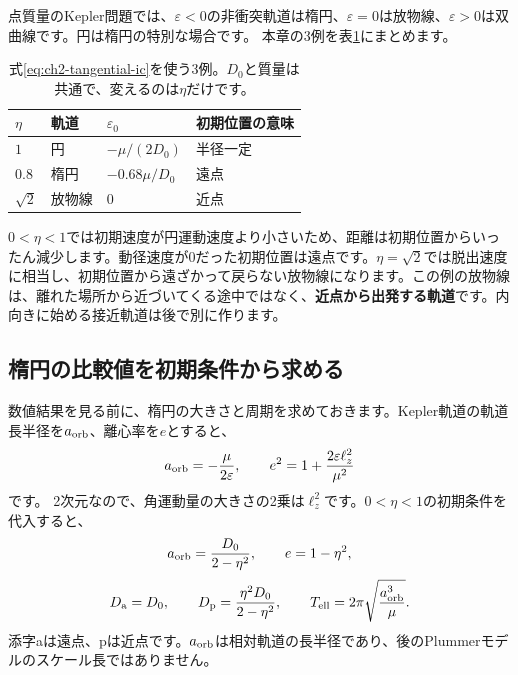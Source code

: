 点質量のKepler問題では、$\varepsilon<0$の非衝突軌道は楕円、$\varepsilon=0$は放物線、$\varepsilon>0$は双曲線です。円は楕円の特別な場合です。\cite{ryden2025} 本章の3例を表\ref{tab:ch2-types}にまとめます。
\begin{table}[htbp]
\centering\small
\caption{式\eqref{eq:ch2-tangential-ic}を使う3例。$D_0$と質量は共通で、変えるのは$\eta$だけです。}
\label{tab:ch2-types}
\begin{tabular}{llll}\toprule
$\eta$ & 軌道 & $\varepsilon_0$ & 初期位置の意味\\\midrule
$1$ & 円 & $-\mu/(2D_0)$ & 半径一定\\
$0.8$ & 楕円 & $-0.68\mu/D_0$ & 遠点\\
$\sqrt{2}$ & 放物線 & $0$ & 近点\\\bottomrule
\end{tabular}
\end{table}

$0<\eta<1$では初期速度が円運動速度より小さいため、距離は初期位置からいったん減少します。動径速度が0だった初期位置は遠点です。$\eta=\sqrt{2}$では脱出速度に相当し、初期位置から遠ざかって戻らない放物線になります。この例の放物線は、離れた場所から近づいてくる途中ではなく、\textbf{近点から出発する軌道}です。内向きに始める接近軌道は後で別に作ります。

\subsection{楕円の比較値を初期条件から求める}
数値結果を見る前に、楕円の大きさと周期を求めておきます。Kepler軌道の軌道長半径を$a_{\rm orb}$、離心率を$e$とすると、
\begin{equation}
a_{\rm orb}=-\frac{\mu}{2\varepsilon},\qquad
 e^2=1+\frac{2\varepsilon\ell_z^2}{\mu^2}
\label{eq:ch2-orbital-elements}
\end{equation}
です。\cite{ryden2025} 2次元なので、角運動量の大きさの2乗は$\ell_z^2$です。$0<\eta<1$の初期条件を代入すると、
\begin{equation}
a_{\rm orb}=\frac{D_0}{2-\eta^2},\qquad e=1-\eta^2,
\label{eq:ch2-ellipse-parameters}
\end{equation}
\begin{equation}
D_{\rm a}=D_0,\qquad D_{\rm p}=\frac{\eta^2D_0}{2-\eta^2},\qquad
T_{\rm ell}=2\pi\sqrt{\frac{a_{\rm orb}^3}{\mu}}.
\label{eq:ch2-ellipse-reference}
\end{equation}
添字aは遠点、pは近点です。$a_{\rm orb}$は相対軌道の長半径であり、後のPlummerモデルのスケール長ではありません。

